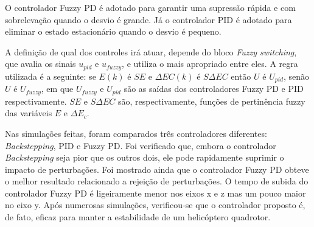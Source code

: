 

O controlador Fuzzy PD é adotado para garantir uma supressão rápida e com sobrelevação quando o desvio é grande. Já o controlador PID é adotado para eliminar o estado estacionário quando o desvio é pequeno.

A definição de qual dos controles irá atuar, depende do bloco \textit{Fuzzy switching}, que avalia os sinais $u_{pid}$ e $u_{fuzzy}$, e utiliza o mais apropriado entre eles. A regra utilizada é a seguinte: se $E(k)$ é $SE$ e $\Delta EC(k)$ é $S\Delta EC$ então $U$ é $U_{pid}$, senão $U$ é $U_{fuzzy}$, em que $U_{fuzzy}$ e $U_{pid}$ são as saídas dos controladores Fuzzy PD e PID respectivamente. $SE$ e $S\Delta EC$ são, respectivamente, funções de pertinência fuzzy das variáveis $E$ e $\Delta E_c$.

Nas simulações feitas, foram comparados três controladores diferentes: \textit{Backstepping}, PID e Fuzzy PD. Foi verificado que, embora o controlador \textit{Backstepping} seja pior que os outros dois, ele pode rapidamente suprimir o impacto de perturbações. Foi mostrado ainda que o controlador Fuzzy PD obteve o melhor resultado relacionado a rejeição de perturbações. O tempo de subida do controlador Fuzzy PD é ligeiramente menor nos eixos x e z mas um pouco maior no eixo y. Após numerosas simulações, verificou-se que o controlador proposto é, de fato, eficaz para manter a estabilidade de um helicóptero quadrotor.

%

